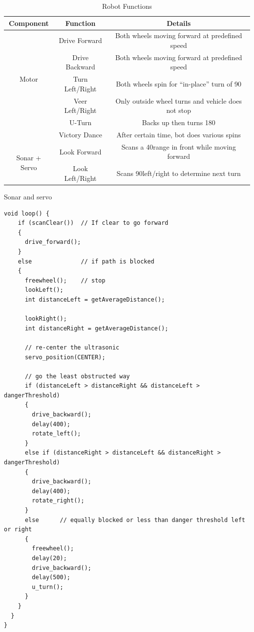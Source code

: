 \documentclass[11pt]{article}
\begin{document}
	\begin {table}[h]
	\begin {center} 
	\vspace{15pt}
	
	\begin{tabular}{||c|c|c||}\hline	
		\textbf{Component}	&	\textbf{Function}	&	\textbf{Details}		\\\hline
		\multirow{5}{*}{Motor}
						&	Drive Forward		&	Both wheels moving forward at predefined speed 		\\
						&	Drive Backward		&	Both wheels moving forward at predefined speed 		\\
						&	Turn Left/Right		&	Both wheels spin for ``in-place'' turn of 90\degree	 	\\
						&	Veer Left/Right		&	Only outside wheel turns and vehicle does not stop\\
						&	U-Turn				&	Backs up then turns 180\degree		\\
						&	Victory Dance		&	After certain time, bot does various spins	\\\hline
		\multirow{2}{*}{Sonar + Servo}
						&	Look Forward		&	Scans a 40\degree range in front while moving forward \\
					&	Look Left/Right		&	Scans 90\degree left/right to determine next turn \\\hline


		
	\end{tabular}
		\caption {Robot Functions} \label{functions}
	\end{center}
	\end{table} 	

Sonar and servo
%


\vspace{12pt}

 \begin{lstlisting}[caption=Control Loop, label=loop]		
void loop() {
    if (scanClear())  // If clear to go forward
    {
      drive_forward();
    }
    else              // if path is blocked
    {
      freewheel();    // stop
      lookLeft();
      int distanceLeft = getAverageDistance();

      lookRight();
      int distanceRight = getAverageDistance();
      
      // re-center the ultrasonic
      servo_position(CENTER);

      // go the least obstructed way
      if (distanceLeft > distanceRight && distanceLeft > dangerThreshold)       
      {
        drive_backward();
        delay(400);
        rotate_left();
      }
      else if (distanceRight > distanceLeft && distanceRight > dangerThreshold) 
      {
        drive_backward();
        delay(400);
        rotate_right();
      }
      else 		// equally blocked or less than danger threshold left or right
      {
        freewheel();
        delay(20);
        drive_backward();
        delay(500);
        u_turn();
      }   
    } 
  }  
}
  \end{lstlisting}
\end{document}
